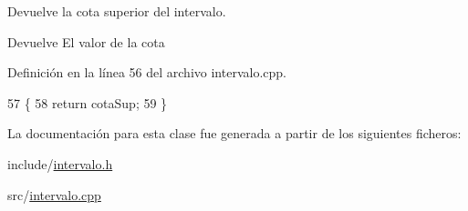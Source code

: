 Devuelve la cota superior del intervalo. 

\begin{DoxyReturn}{Devuelve}
El valor de la cota 
\end{DoxyReturn}


Definición en la línea 56 del archivo intervalo.\+cpp.


\begin{DoxyCode}
57 \{
58     \textcolor{keywordflow}{return} cotaSup;
59 \}
\end{DoxyCode}


La documentación para esta clase fue generada a partir de los siguientes ficheros\+:\begin{DoxyCompactItemize}
\item 
include/\hyperlink{intervalo_8h}{intervalo.\+h}\item 
src/\hyperlink{intervalo_8cpp}{intervalo.\+cpp}\end{DoxyCompactItemize}
